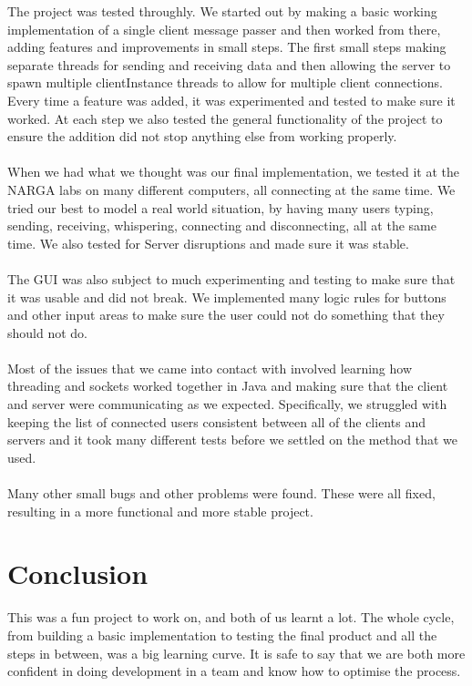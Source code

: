 \documentclass[12pt]{article}
\begin{document}
The project was tested throughly. We started out by making a basic working implementation of
a single client message passer and then worked from there, adding features and improvements in small
steps. The first small steps making separate threads for sending and receiving data and then
allowing the server to spawn multiple clientInstance threads to allow for multiple client connections.
Every time a feature was added, it was experimented and tested to make sure it worked. At each step
we also tested the general functionality of the project to ensure the addition did not
stop anything else from working properly.
\\\\
When we had what we thought was our final implementation, we tested it at the
NARGA labs on many different computers, all connecting at the same time. We tried our best
to model a real world situation, by having many users typing, sending, receiving, whispering, connecting
and disconnecting, all at the same time. We also tested for Server disruptions and
made sure it was stable.
\\\\
The GUI was also subject to much experimenting and testing to make sure that it was
usable and did not break. We implemented many logic rules for buttons and other input
areas to make sure the user could not do something that they should not do.
\\\\
Most of the issues that we came into contact with involved learning how threading and sockets worked
together in Java and making sure that the client and server were communicating as we expected. Specifically,
we struggled with keeping the list of connected users consistent between all of the clients and servers
and it took many different tests before we settled on the method that we used.
\\\\
Many other small bugs and other problems were found. These were all fixed, resulting in a more
functional and more stable project.

\section{Conclusion}

This was a fun project to work on, and both of us learnt a lot. The whole cycle, from
building a basic implementation to testing the final product and all the steps in between,
was a big learning curve. It is safe to say that we are both more confident in doing
development in a team and know how to optimise the process.
\end{document}
